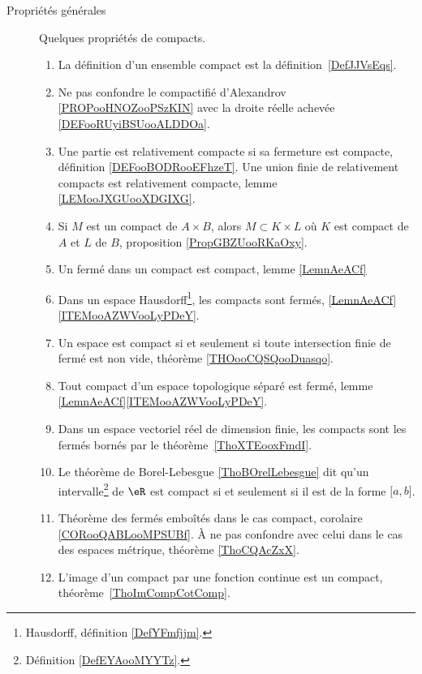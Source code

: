         \label{THEMEooQQBHooLcqoKB}
\begin{description}

	\item[Propriétés générales]

		Quelques propriétés de compacts.

		\begin{enumerate}
			\item
			      La définition d'un ensemble compact est la définition~\ref{DefJJVsEqs}.
			\item
			      Ne pas confondre le compactifié d'Alexandrov \ref{PROPooHNOZooPSzKIN} avec la droite réelle achevée \ref{DEFooRUyiBSUooALDDOa}.
			\item
			      Une partie est relativement compacte si sa fermeture est compacte, définition \ref{DEFooBODRooEFhzeT}. Une union finie de relativement compacts est relativement compacte, lemme \ref{LEMooJXGUooXDGIXG}.
			\item
			      Si \( M\) est un compact de \( A\times B\), alors \( M\subset K\times L\) où \( K\) est compact de \( A\) et \( L\) de \( B\), proposition \ref{PropGBZUooRKaOxy}.
			\item
			      Un fermé dans un compact est compact, lemme \ref{LemnAeACf}
			\item
			      Dans un espace Hausdorff\footnote{Hausdorff, définition \ref{DefYFmfjjm}.}, les compacts sont fermés, \ref{LemnAeACf}\ref{ITEMooAZWVooLyPDeY}.
			\item
			      Un espace est compact si et seulement si toute intersection finie de fermé est non vide, théorème \ref{THOooCQSQooDuasqo}.
			\item
			      Tout compact d'un espace topologique séparé est fermé, lemme \ref{LemnAeACf}\ref{ITEMooAZWVooLyPDeY}.
			\item
			      Dans un espace vectoriel réel de dimension finie, les compacts sont les fermés bornés par le théorème~\ref{ThoXTEooxFmdI}.
			\item
			      Le théorème de Borel-Lebesgue \ref{ThoBOrelLebesgue} dit qu'un intervalle\footnote{Définition \ref{DefEYAooMYYTz}.} de \( \eR\) est compact si et seulement si il est de la forme \( \mathopen[ a , b \mathclose]\).
			\item
			      Théorème des fermés emboîtés dans le cas compact, corolaire \ref{CORooQABLooMPSUBf}. À ne pas confondre avec celui dans le cas des espaces métrique, théorème \ref{ThoCQAcZxX}.
			\item
			      L'image d'un compact par une fonction continue est un compact, théorème~\ref{ThoImCompCotComp}.

\end{enumerate}
\end{description}

